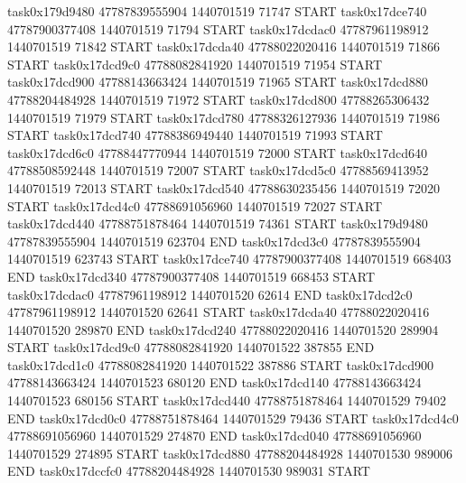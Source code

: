 task0x179d9480 47787839555904          1440701519                71747  START
task0x17dce740 47787900377408          1440701519                71794  START
task0x17dcdac0 47787961198912          1440701519                71842  START
task0x17dcda40 47788022020416          1440701519                71866  START
task0x17dcd9c0 47788082841920          1440701519                71954  START
task0x17dcd900 47788143663424          1440701519                71965  START
task0x17dcd880 47788204484928          1440701519                71972  START
task0x17dcd800 47788265306432          1440701519                71979  START
task0x17dcd780 47788326127936          1440701519                71986  START
task0x17dcd740 47788386949440          1440701519                71993  START
task0x17dcd6c0 47788447770944          1440701519                72000  START
task0x17dcd640 47788508592448          1440701519                72007  START
task0x17dcd5c0 47788569413952          1440701519                72013  START
task0x17dcd540 47788630235456          1440701519                72020  START
task0x17dcd4c0 47788691056960          1440701519                72027  START
task0x17dcd440 47788751878464          1440701519                74361  START
task0x179d9480 47787839555904          1440701519               623704  END
task0x17dcd3c0 47787839555904          1440701519               623743  START
task0x17dce740 47787900377408          1440701519               668403  END
task0x17dcd340 47787900377408          1440701519               668453  START
task0x17dcdac0 47787961198912          1440701520                62614  END
task0x17dcd2c0 47787961198912          1440701520                62641  START
task0x17dcda40 47788022020416          1440701520               289870  END
task0x17dcd240 47788022020416          1440701520               289904  START
task0x17dcd9c0 47788082841920          1440701522               387855  END
task0x17dcd1c0 47788082841920          1440701522               387886  START
task0x17dcd900 47788143663424          1440701523               680120  END
task0x17dcd140 47788143663424          1440701523               680156  START
task0x17dcd440 47788751878464          1440701529                79402  END
task0x17dcd0c0 47788751878464          1440701529                79436  START
task0x17dcd4c0 47788691056960          1440701529               274870  END
task0x17dcd040 47788691056960          1440701529               274895  START
task0x17dcd880 47788204484928          1440701530               989006  END
task0x17dccfc0 47788204484928          1440701530               989031  START
